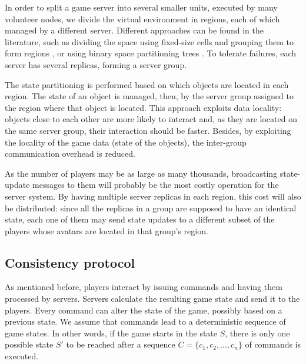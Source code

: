 \documentclass[]{usiinfprospectus}
\begin{document}
In order to split a game server into several smaller units, executed by many volunteer nodes, we divide the virtual environment in regions, each of which managed by a different server. Different approaches can be found in the literature, such as dividing the space using fixed-size cells and grouping them to form regions \cite{devleeschauwer2005dma}, or using binary space partitioning trees \cite{bezerra2009fgl}. To tolerate failures, each server has several replicas, forming a server group.

The state partitioning is performed based on which objects are located in each region. The state of an object is managed, then, by the server group assigned to the region where that object is located. This approach exploits data locality: objects close to each other are more likely to interact and, as they are located on the same server group, their interaction should be faster. Besides, by exploiting the locality of the game data (state of the objects), the inter-group communication overhead is reduced.

As the number of players may be as large as many thousands, broadcasting state-update messages to them will probably be the most costly operation for the server system. By having multiple server replicas in each region, this cost will also be distributed: since all the replicas in a group are supposed to have an identical state, each one of them may send state updates to a different subset of the players whose avatars are located in that group's region.

\subsection{Consistency protocol} \label{sec:consprot}

As mentioned before, players interact by issuing commands and having them processed by servers. Servers calculate the resulting game state and send it to the players. Every command can alter the state of the game, possibly based on a previous state. We assume that commands lead to a deterministic sequence of game states. In other words, if the game starts in the state $S$, there is only one possible state $S'$ to be reached after a sequence $C=\{c_{1}, c_{2}, ..., c_{n}\}$ of commands is executed.
\end{document}
